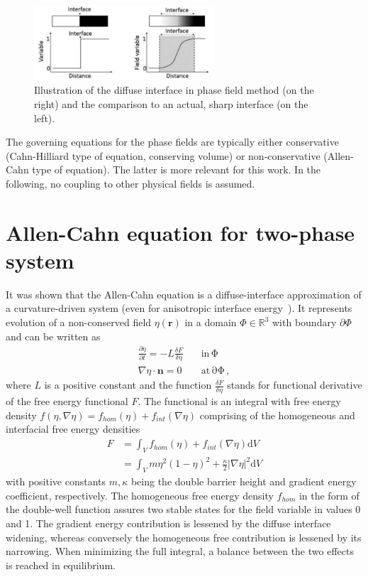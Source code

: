 \begin{figure}
	\centering
	\includegraphics[width = 0.6\textwidth]{chapters/03PFintro/image/diffuse_interface_Bellemans2017}
	\caption[Interface width in phase field method]{Illustration of the diffuse interface in phase field method (on the right) and the comparison to an actual, sharp interface (on the left).~\cite{Bellemans2017}}
	\label{fig_PFintro_diffuse_interface}
\end{figure}

The governing equations for the phase fields are typically either conservative (Cahn-Hilliard type of equation, conserving volume) or non-conservative (Allen-Cahn type of equation). The latter is more relevant for this work. In the following, no coupling to other physical fields is assumed.

\section{Allen-Cahn equation for two-phase system}
It was shown that the Allen-Cahn equation is a diffuse-interface approximation of a curvature-driven system (even for anisotropic interface energy~\cite{Elliott1996}). It represents evolution of a non-conserved field $\eta(\mathbf{r})$ in a domain $\Phi\in\mathbb{R}^3$ with boundary $\partial\Phi$ and can be written as
\begin{align}
	\frac{\partial \eta}{\partial t} = -L\frac{\delta F}{\delta \eta} \quad &\mathrm{in \,\Phi}\\
	\nabla\eta\cdot\bm{n} = 0 \quad &\mathrm{at \, \partial\Phi}\,,
\end{align}
where $L$ is a positive constant and the function $\frac{\delta F}{\delta \eta}$ stands for functional derivative of the free energy functional $F$. The functional is an integral with free energy density $f(\eta,\nabla\eta)=f_{hom}(\eta)+f_{int}(\nabla\eta)$ comprising of the homogeneous and interfacial free energy densities
\begin{align}
	F 	&= \int_V f_{hom}(\eta)+f_{int}(\nabla\eta) \mathrm{d}V\\
		&= \int_V m \eta^2(1-\eta)^2 + \frac{\kappa}{2}|\nabla\eta|^2 \mathrm{d}V
\end{align}
with positive constants $m,\kappa$ being the double barrier height and gradient energy coefficient, respectively. The homogeneous free energy density $f_{hom}$ in the form of the double-well function assures two stable states for the field variable in values 0 and 1. The gradient energy contribution is lessened by the diffuse interface widening, whereas conversely the homogeneous free contribution is lessened by its narrowing. When minimizing the full integral, a balance between the two effects is reached in equilibrium.

